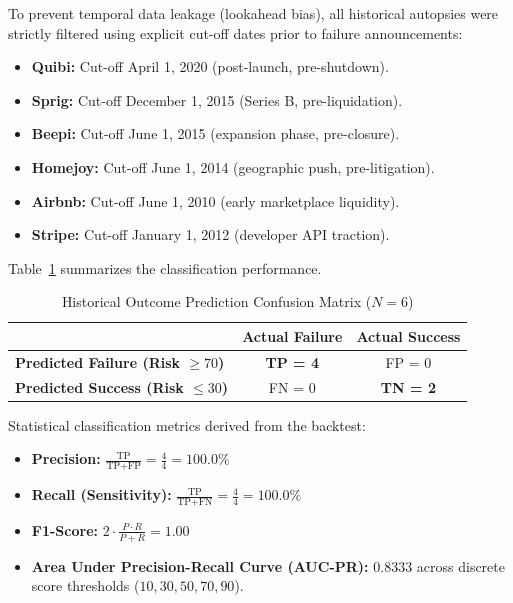 \documentclass[conference]{IEEEtran}
\begin{document}
To prevent temporal data leakage (lookahead bias), all historical autopsies were strictly filtered using explicit cut-off dates prior to failure announcements:
\begin{itemize}
    \item \textbf{Quibi:} Cut-off April 1, 2020 (post-launch, pre-shutdown).
    \item \textbf{Sprig:} Cut-off December 1, 2015 (Series B, pre-liquidation).
    \item \textbf{Beepi:} Cut-off June 1, 2015 (expansion phase, pre-closure).
    \item \textbf{Homejoy:} Cut-off June 1, 2014 (geographic push, pre-litigation).
    \item \textbf{Airbnb:} Cut-off June 1, 2010 (early marketplace liquidity).
    \item \textbf{Stripe:} Cut-off January 1, 2012 (developer API traction).
\end{itemize}

Table~\ref{tab:confusion} summarizes the classification performance.

\begin{table}[htbp]
\caption{Historical Outcome Prediction Confusion Matrix ($N = 6$)}
\begin{center}
\begin{tabular}{lcc}
\toprule
 & \textbf{Actual Failure} & \textbf{Actual Success} \\
\midrule
\textbf{Predicted Failure (Risk $\ge 70$)} & \textbf{TP = 4} & FP = 0 \\
\textbf{Predicted Success (Risk $\le 30$)} & FN = 0 & \textbf{TN = 2} \\
\bottomrule
\end{tabular}
\label{tab:confusion}
\end{center}
\end{table}

Statistical classification metrics derived from the backtest:
\begin{itemize}
    \item \textbf{Precision:} $\frac{\text{TP}}{\text{TP} + \text{FP}} = \frac{4}{4} = \mathbf{100.0\%}$
    \item \textbf{Recall (Sensitivity):} $\frac{\text{TP}}{\text{TP} + \text{FN}} = \frac{4}{4} = \mathbf{100.0\%}$
    \item \textbf{F1-Score:} $2 \cdot \frac{P \cdot R}{P + R} = \mathbf{1.00}$
    \item \textbf{Area Under Precision-Recall Curve (AUC-PR):} $\mathbf{0.8333}$ across discrete score thresholds ($10, 30, 50, 70, 90$).
\end{itemize}
\end{document}
